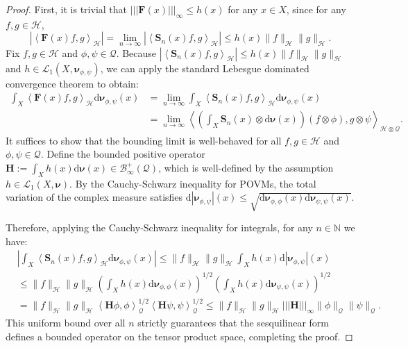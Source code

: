 \documentclass[10pt,a4paper]{amsart}
\newcommand{\innpr}[2]{{\left\langle {#1},{#2}\right\rangle}} %
\newcommand{\mb}[1]{\boldsymbol{#1}} %
\newcommand{\m}[1]{\mathbf{#1}} %
\newcommand{\rd}{\mathrm{d}} %
\newcommand{\vertiii}[1]{\mathopen{|||} #1 \mathclose{|||}}
\renewcommand{\b}[1]{\mathbb{#1}} %
\renewcommand{\c}[1]{\mathcal{#1}} %
\begin{document}
\begin{proof}
First, it is trivial that $\vertiii{\m{F}(x)}_{\infty} \le h(x)$ for any $x \in X$, since for any $f, g \in \c{H}$,
\begin{equation*}
    |\innpr{\m{F}(x) f}{g}_{\c{H}}| = \lim_{n \to \infty} |\innpr{\m{S}_{n}(x) f}{g}_{\c{H}}| \le h(x) \|f\|_{\c{H}} \|g\|_{\c{H}}.
\end{equation*}
Fix $f, g \in \c{H}$ and $\phi, \psi \in \c{Q}$. Because $|\innpr{\m{S}_{n}(x) f}{g}_{\c{H}}| \le h(x) \|f\|_{\c{H}} \|g\|_{\c{H}}$ and $h \in \c{L}_{1}(X, \mb{\nu}_{\phi, \psi})$, we can apply the standard Lebesgue dominated convergence theorem to obtain:
\begin{align*}
    \int_{X} \innpr{\m{F}(x) f}{g}_{\c{H}} \rd \mb{\nu}_{\phi, \psi} (x) &= \lim_{n \to \infty} \int_{X} \innpr{\m{S}_{n}(x) f}{g}_{\c{H}} \rd \mb{\nu}_{\phi, \psi} (x) \\
    &= \lim_{n \to \infty} \innpr{\left( \int_{X} \m{S}_{n}(x) \otimes \rd \mb{\nu}(x) \right) (f \otimes \phi)}{g \otimes \psi}_{\c{H} \otimes \c{Q}}.
\end{align*}
It suffices to show that the bounding limit is well-behaved for all $f, g \in \c{H}$ and $\phi, \psi \in \c{Q}$. Define the bounded positive operator $\m{H} := \int_{X} h(x) \rd \mb{\nu}(x) \in \c{B}_{\infty}^{+}(\c{Q})$, which is well-defined by the assumption $h \in \c{L}_{1}(X, \mb{\nu})$. By the Cauchy-Schwarz inequality for POVMs, the total variation of the complex measure satisfies $\rd |\mb{\nu}_{\phi, \psi}|(x) \le \sqrt{\rd\mb{\nu}_{\phi, \phi}(x) \rd\mb{\nu}_{\psi, \psi}(x)}$. 

Therefore, applying the Cauchy-Schwarz inequality for integrals, for any $n \in \b{N}$ we have:
\begin{align*}
    &\left| \int_{X} \innpr{\m{S}_{n}(x) f}{g}_{\c{H}} \rd \mb{\nu}_{\phi, \psi} (x) \right| 
    \le \|f\|_{\c{H}} \|g\|_{\c{H}} \int_{X} h(x) \rd |\mb{\nu}_{\phi, \psi}| (x) \\ 
    &\le \|f\|_{\c{H}} \|g\|_{\c{H}} \left( \int_{X} h(x) \rd \mb{\nu}_{\phi, \phi} (x) \right)^{1/2} \left( \int_{X} h(x) \rd \mb{\nu}_{\psi, \psi} (x) \right)^{1/2} \\
    &= \|f\|_{\c{H}} \|g\|_{\c{H}} \innpr{\m{H} \phi}{\phi}_{\c{Q}}^{1/2} \innpr{\m{H} \psi}{\psi}_{\c{Q}}^{1/2} \le \|f\|_{\c{H}} \|g\|_{\c{H}} \vertiii{\m{H}}_{\infty} \|\phi\|_{\c{Q}} \|\psi\|_{\c{Q}}.
\end{align*}
This uniform bound over all $n$ strictly guarantees that the sesquilinear form defines a bounded operator on the tensor product space, completing the proof.
\end{proof}
\end{document}
